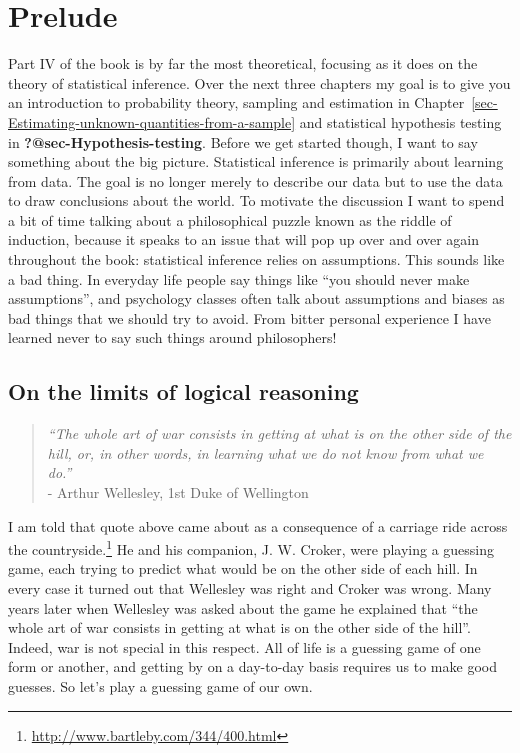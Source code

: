 \documentclass[
  a4paper,
]{book}
\begin{document}
\hypertarget{prelude}{%
\chapter*{Prelude}\label{prelude}}


Part IV of the book is by far the most theoretical, focusing as it does
on the theory of statistical inference. Over the next three chapters my
goal is to give you an introduction to probability theory, sampling and
estimation in
Chapter~\ref{sec-Estimating-unknown-quantities-from-a-sample} and
statistical hypothesis testing in \textbf{?@sec-Hypothesis-testing}.
Before we get started though, I want to say something about the big
picture. Statistical inference is primarily about learning from data.
The goal is no longer merely to describe our data but to use the data to
draw conclusions about the world. To motivate the discussion I want to
spend a bit of time talking about a philosophical puzzle known as the
riddle of induction, because it speaks to an issue that will pop up over
and over again throughout the book: statistical inference relies on
assumptions. This sounds like a bad thing. In everyday life people say
things like ``you should never make assumptions'', and psychology
classes often talk about assumptions and biases as bad things that we
should try to avoid. From bitter personal experience I have learned
never to say such things around philosophers!

\hypertarget{on-the-limits-of-logical-reasoning}{%
\section*{On the limits of logical
reasoning}\label{on-the-limits-of-logical-reasoning}}


\begin{quote}
\emph{``The whole art of war consists in getting at what is on the other
side of the hill, or, in other words, in learning what we do not know
from what we do.''}\\
- Arthur Wellesley, 1st Duke of Wellington
\end{quote}

I am told that quote above came about as a consequence of a carriage
ride across the countryside.\footnote{\href{\%0A\%20http://www.bartleby.com/344/400.html}{http://www.bartleby.com/344/400.html}}
He and his companion, J. W. Croker, were playing a guessing game, each
trying to predict what would be on the other side of each hill. In every
case it turned out that Wellesley was right and Croker was wrong. Many
years later when Wellesley was asked about the game he explained that
``the whole art of war consists in getting at what is on the other side
of the hill''. Indeed, war is not special in this respect. All of life
is a guessing game of one form or another, and getting by on a
day-to-day basis requires us to make good guesses. So let's play a
guessing game of our own.
\end{document}
